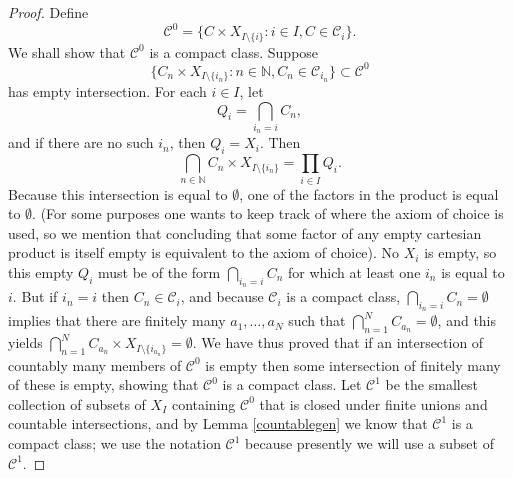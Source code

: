 \documentclass{article}
\theoremstyle{definition}
\begin{document}
\begin{proof}
Define
\[
\mathscr{C}^0 = \{C \times X_{I \setminus \{i\}}: i \in I, C \in \mathscr{C}_i\}.
\]
We shall show that $\mathscr{C}^0$ is a compact class. 
Suppose 
\[
 \{C_{n} \times X_{I \setminus \{i_n\}}: n \in \mathbb{N}, C_n \in \mathscr{C}_{i_n} \} \subset \mathscr{C}^0
\]
has empty intersection.
For each $i \in I$, let
\[
Q_i = \bigcap_{i_n = i} C_n,
\]
and if there are no such $i_n$, then $Q_i = X_i$. Then
\[
\bigcap_{n \in \mathbb{N}} C_n  \times X_{I \setminus \{i_n\}} = \prod_{i \in I} Q_i.
\]
Because this intersection is equal to $\emptyset$,  one of the factors in the product is equal to $\emptyset$. (For some purposes one wants
to keep track of where the axiom of choice is used, so we mention that concluding that some factor of any empty cartesian product is itself
empty is equivalent to  the axiom of choice). No $X_i$ is empty, so this empty $Q_i$  must be of the form
$\bigcap_{i_n = i} C_n$ for which at least one $i_n$ is equal to $i$. But if $i_n = i$ then $C_n \in \mathscr{C}_i$, and because $\mathscr{C}_i$ is a compact class,
$\bigcap_{i_n =i}  C_n = \emptyset$ implies that there are finitely many $a_1,\ldots,a_N$ such that
$\bigcap_{n=1}^N C_{a_n} = \emptyset$, and this yields $\bigcap_{n=1}^N C_{a_n} \times X_{I \setminus \{i_{a_n}\}} = \emptyset$. 
We have thus proved that if an intersection of countably many members of $\mathscr{C}^0$ is empty then some intersection
of finitely many of these is empty, showing that $\mathscr{C}^0$ is a compact class.
Let $\mathscr{C}^1$ be the smallest collection of subsets of $X_I$ containing $\mathscr{C^0}$ that is closed under finite unions and countable
intersections, and by Lemma \ref{countablegen} we know that $\mathscr{C}^1$ is a compact class; we use the notation $\mathscr{C}^1$ because presently
we will use a subset of $\mathscr{C}^1$.


\end{proof}
\end{document}
